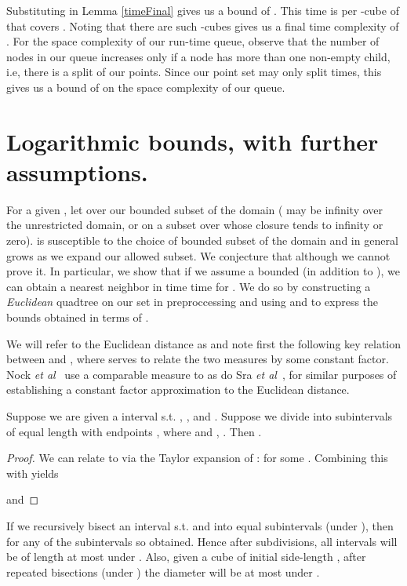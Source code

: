 \documentclass[11pt]{myclass}
\newcommand{\etal}{\emph{et al}\xspace}
\begin{document}
Substituting  in Lemma \ref{timeFinal} gives us a bound 
of . 
 This time is per -cube of  that covers . Noting 
that there are  such -cubes gives us a final time complexity of .
For the space complexity of our run-time queue, observe that the number of nodes in our queue 
increases only if a node has more than one non-empty child, i.e, there is a split of our  points. 
Since our point set may only split  times, this gives us a bound of  on the space complexity 
of our queue. 


\section{Logarithmic bounds, with further assumptions.}
\label{sec:condition}
For a given , let  
over our bounded subset of the domain ( may be infinity over the unrestricted domain, or on a subset over whose closure  tends to infinity or zero).  is susceptible to the choice of bounded subset of the domain and in general grows as we expand our allowed subset.
We conjecture that  although we cannot prove it. In particular, we show that if we assume a bounded  (in addition to ), 
we can obtain a  nearest neighbor in time  time for . We do so by constructing a \emph{Euclidean} quadtree  on our set
in preproccessing and using  and  to express the bounds obtained in terms of .

We will refer to the Euclidean distance  as  and note first the following key relation between  and , where  serves to relate the two measures by some constant factor. Nock \etal~\cite{mixed} use a comparable measure to  as do Sra \etal~\cite{tensorclust}, for similar purposes of establishing a constant factor approximation 
to the Euclidean distance.

\begin{lemma}\label{EucBregBisect}
Suppose we are given a interval  s.t. , , and . 
Suppose we divide  into  subintervals of equal length with endpoints , where  and , .
Then .
\end{lemma}

\begin{proof}
We can relate  to  via the Taylor expansion of :
  for some . Combining this with  yields 



and  


\end{proof}

\begin{corollary}\label{repbis}
If we recursively bisect an interval  s.t.  and  
into  equal subintervals (under ), then 
 for any of the
subintervals  so obtained. Hence after  subdivisions, all intervals will be of length 
at most  under .
Also, given a cube of initial side-length , after  repeated bisections (under ) 
the diameter will be at most   under .
\end{corollary}
\end{document}
